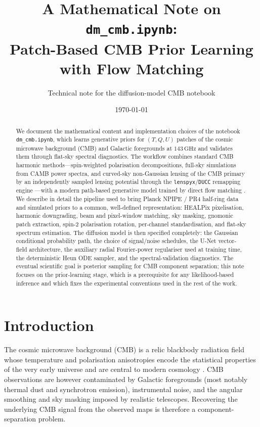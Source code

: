 \documentclass[11pt]{article}
\title{A Mathematical Note on \texttt{dm\_cmb.ipynb}:\\
Patch-Based CMB Prior Learning with Flow Matching}
\author{Technical note for the diffusion-model CMB notebook}
\date{\today}
\theoremstyle{definition}
\begin{document}
\maketitle
\begin{abstract}
We document the mathematical content and implementation choices of the notebook \texttt{dm\_cmb.ipynb}, which learns generative priors for $(T,Q,U)$ patches of the cosmic microwave background (CMB) and Galactic foregrounds at $143\,\mathrm{GHz}$ and validates them through flat-sky spectral diagnostics. The workflow combines standard CMB harmonic methods---spin-weighted polarisation decompositions, full-sky simulations from CAMB power spectra, and curved-sky non-Gaussian lensing of the CMB primary by an independently sampled lensing potential through the \texttt{lenspyx}/\texttt{DUCC} remapping engine \cite{zaldarriaga1997,kamionkowski1997,gorski2005,lewis2000camb,sullivan2024methods,scott2024pdg,reinecke2023ducc}---with a modern path-based generative model trained by direct flow matching \cite{ho2020ddpm,song2021sde,lipman2023flowmatching}. We describe in detail the pipeline used to bring Planck NPIPE / PR4 half-ring data and simulated priors to a common, well-defined representation: HEALPix pixelisation, harmonic downgrading, beam and pixel-window matching, sky masking, gnomonic patch extraction, spin-2 polarisation rotation, per-channel standardisation, and flat-sky spectrum estimation. The diffusion model is then specified completely: the Gaussian conditional probability path, the choice of signal/noise schedules, the U-Net vector-field architecture, the auxiliary radial Fourier-power regulariser used at training time, the deterministic Heun ODE sampler, and the spectral-validation diagnostics. The eventual scientific goal is posterior sampling for CMB component separation; this note focuses on the prior-learning stage, which is a prerequisite for any likelihood-based inference and which fixes the experimental conventions used in the rest of the work.
\end{abstract}
\tableofcontents
\bigskip







\section{Introduction}
\label{sec:intro}

The cosmic microwave background (CMB) is a relic blackbody radiation field whose temperature and polarisation anisotropies encode the statistical properties of the very early universe and are central to modern cosmology \cite{scott2024pdg,planck2018overview}. CMB observations are however contaminated by Galactic foregrounds (most notably thermal dust and synchrotron emission), instrumental noise, and the angular smoothing and sky masking imposed by realistic telescopes. Recovering the underlying CMB signal from the observed maps is therefore a component-separation problem.
\end{document}

